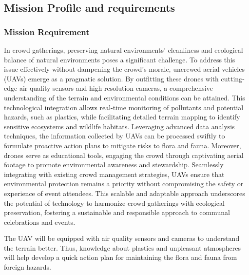 \documentclass[12 pt]{article}
\begin{document}
\subsection{{Mission Profile and requirements}}

\subsubsection{{Mission Requirement}}
In crowd gatherings, preserving natural environments' cleanliness and ecological balance of natural environments poses a significant challenge. To address this issue effectively without dampening the crowd's morale, uncrewed aerial vehicles (UAVs) emerge as a pragmatic solution. By outfitting these drones with cutting-edge air quality sensors and high-resolution cameras, a comprehensive understanding of the terrain and environmental conditions can be attained. This technological integration allows real-time monitoring of pollutants and potential hazards, such as plastics, while facilitating detailed terrain mapping to identify sensitive ecosystems and wildlife habitats. Leveraging advanced data analysis techniques, the information collected by UAVs can be processed swiftly to formulate proactive action plans to mitigate risks to flora and fauna.
Moreover, drones serve as educational tools, engaging the crowd through captivating aerial footage to promote environmental awareness and stewardship. Seamlessly integrating with existing crowd management strategies, UAVs ensure that environmental protection remains a priority without compromising the safety or experience of event attendees. This scalable and adaptable approach underscores the potential of technology to harmonize crowd gatherings with ecological preservation, fostering a sustainable and responsible approach to communal celebrations and events. 

The UAV will be equipped with air quality sensors and cameras to understand the terrain better. Thus, knowledge about plastics and unpleasant atmospheres will help develop a quick action plan for maintaining the flora and fauna from foreign hazards.
\end{document}
